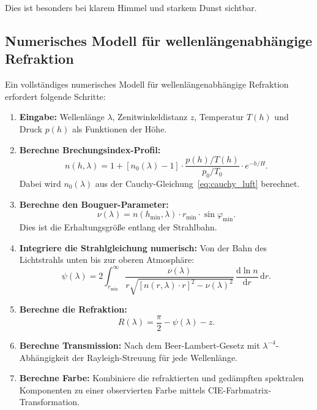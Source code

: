 \documentclass[12pt,a4paper]{article}
\begin{document}
Dies ist besonders bei klarem Himmel und starkem Dunst sichtbar.

\subsection{Numerisches Modell für wellenlängenabhängige Refraktion}
\label{subsec:numerisches_modell}

Ein vollständiges numerisches Modell für wellenlängenabhängige Refraktion
erfordert folgende Schritte:

\begin{enumerate}
	\item \textbf{Eingabe:} Wellenlänge $\lambda$, Zenitwinkeldistanz $z$,
	      Temperatur $T(h)$ und Druck $p(h)$ als Funktionen der Höhe.
	
	\item \textbf{Berechne Brechungsindex-Profil:}
	\begin{equation}
		n(h, \lambda) = 1 + \left[n_0(\lambda) - 1\right] \cdot 
		\frac{p(h)/T(h)}{p_0/T_0} \cdot e^{-h/H}.
	\end{equation}
	      Dabei wird $n_0(\lambda)$ aus der Cauchy-Gleichung~\eqref{eq:cauchy_luft} berechnet.
	
	\item \textbf{Berechne den Bouguer-Parameter:}
	\begin{equation}
		\nu(\lambda) = n(h_{\mathrm{min}}, \lambda) \cdot r_{\mathrm{min}} \cdot \sin\varphi_{\mathrm{min}}.
	\end{equation}
	      Dies ist die Erhaltungsgröße entlang der Strahlbahn.
	
	\item \textbf{Integriere die Strahlgleichung numerisch:}
	      Von der Bahn des Lichtstrahls unten bis zur oberen Atmosphäre:
	\begin{equation}
		\psi(\lambda) = 2\int_{r_{\mathrm{min}}}^{\infty}
		\frac{\nu(\lambda)}{r\sqrt{[n(r,\lambda) \cdot r]^2 - \nu(\lambda)^2}} \,
		\frac{\mathrm{d} \ln n}{\mathrm{d}r} \, \mathrm{d}r.
	\end{equation}
	
	\item \textbf{Berechne die Refraktion:}
	\begin{equation}
		R(\lambda) = \frac{\pi}{2} - \psi(\lambda) - z.
	\end{equation}
	
	\item \textbf{Berechne Transmission:}
	      Nach dem Beer-Lambert-Gesetz mit $\lambda^{-4}$-Abhängigkeit der
	      Rayleigh-Streuung für jede Wellenlänge.
	
	\item \textbf{Berechne Farbe:}
	      Kombiniere die refraktierten und gedämpften spektralen Komponenten
	      zu einer observierten Farbe mittels CIE-Farbmatrix-Transformation.
\end{enumerate}
\end{document}

